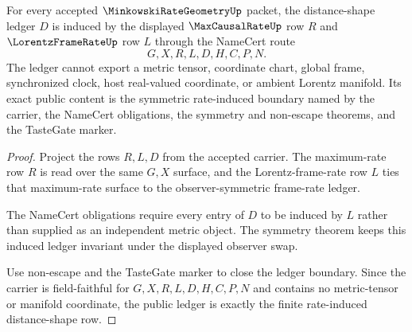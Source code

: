 \begin{theorem}
\label{thm:minkowski-rate-geometry-ledger-exactness}
For every accepted $\MinkowskiRateGeometryUp$ packet, the distance-shape ledger $D$ is induced by the displayed $\MaxCausalRateUp$ row $R$ and $\LorentzFrameRateUp$ row $L$ through the NameCert route
$$
G,X,R,L,D,H,C,P,N.
$$
The ledger cannot export a metric tensor, coordinate chart, global frame, synchronized clock, host real-valued coordinate, or ambient Lorentz manifold. Its exact public content is the symmetric rate-induced boundary named by the carrier, the NameCert obligations, the symmetry and non-escape theorems, and the TasteGate marker.
\end{theorem}
\begin{proof}
Project the rows $R,L,D$ from the accepted carrier. The maximum-rate row $R$ is read over the same $G,X$ surface, and the Lorentz-frame-rate row $L$ ties that maximum-rate surface to the observer-symmetric frame-rate ledger.

The NameCert obligations require every entry of $D$ to be induced by $L$ rather than supplied as an independent metric object. The symmetry theorem keeps this induced ledger invariant under the displayed observer swap.

Use non-escape and the TasteGate marker to close the ledger boundary. Since the carrier is field-faithful for $G,X,R,L,D,H,C,P,N$ and contains no metric-tensor or manifold coordinate, the public ledger is exactly the finite rate-induced distance-shape row.
\end{proof}

